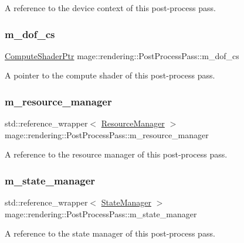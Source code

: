 A reference to the device context of this post-\/process pass. \hypertarget{classmage_1_1rendering_1_1_post_process_pass_aec72e5a7ca28c11754f85ab6726ce5ec}{}\label{classmage_1_1rendering_1_1_post_process_pass_aec72e5a7ca28c11754f85ab6726ce5ec} 
\subsubsection{\texorpdfstring{m\+\_\+dof\+\_\+cs}{m\_dof\_cs}}
{\footnotesize\ttfamily \hyperlink{namespacemage_1_1rendering_ab3dc9f2114f2e9255b91d9c051da52ea}{Compute\+Shader\+Ptr} mage\+::rendering\+::\+Post\+Process\+Pass\+::m\+\_\+dof\+\_\+cs\hspace{0.3cm}{\ttfamily [private]}}

A pointer to the compute shader of this post-\/process pass. \hypertarget{classmage_1_1rendering_1_1_post_process_pass_af20e46967d28e7e0500fff6b1988ad80}{}\label{classmage_1_1rendering_1_1_post_process_pass_af20e46967d28e7e0500fff6b1988ad80} 
\subsubsection{\texorpdfstring{m\+\_\+resource\+\_\+manager}{m\_resource\_manager}}
{\footnotesize\ttfamily std\+::reference\+\_\+wrapper$<$ \hyperlink{classmage_1_1rendering_1_1_resource_manager}{Resource\+Manager} $>$ mage\+::rendering\+::\+Post\+Process\+Pass\+::m\+\_\+resource\+\_\+manager\hspace{0.3cm}{\ttfamily [private]}}

A reference to the resource manager of this post-\/process pass. \hypertarget{classmage_1_1rendering_1_1_post_process_pass_a80cbe6aee950e5bcc98763813fdb8aba}{}\label{classmage_1_1rendering_1_1_post_process_pass_a80cbe6aee950e5bcc98763813fdb8aba} 
\subsubsection{\texorpdfstring{m\+\_\+state\+\_\+manager}{m\_state\_manager}}
{\footnotesize\ttfamily std\+::reference\+\_\+wrapper$<$ \hyperlink{classmage_1_1rendering_1_1_state_manager}{State\+Manager} $>$ mage\+::rendering\+::\+Post\+Process\+Pass\+::m\+\_\+state\+\_\+manager\hspace{0.3cm}{\ttfamily [private]}}

A reference to the state manager of this post-\/process pass. 